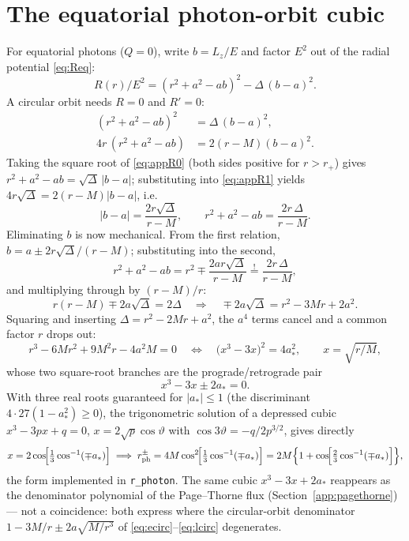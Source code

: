 \section{The equatorial photon-orbit cubic}
\label{app:photoncubic}

For equatorial photons ($Q = 0$), write $b = L_z/E$ and factor $E^2$
out of the radial potential \eqref{eq:Req}:
\begin{equation}
R(r)/E^2 = (r^2 + a^2 - ab)^2 - \Delta\,(b-a)^2 .
\end{equation}
A circular orbit needs $R = 0$ and $R' = 0$:
\begin{align}
(r^2 + a^2 - ab)^2 &= \Delta\,(b-a)^2,
\label{eq:appR0}\\
4r\,(r^2 + a^2 - ab) &= 2(r - M)(b-a)^2.
\label{eq:appR1}
\end{align}
Taking the square root of \eqref{eq:appR0} (both sides positive for
$r > r_+$) gives $r^2 + a^2 - ab = \sqrt{\Delta}\,|b - a|$; substituting
into \eqref{eq:appR1} yields
$4r\sqrt{\Delta} = 2(r-M)|b-a|$, i.e.
\begin{equation}
|b - a| = \frac{2r\sqrt{\Delta}}{r - M},
\qquad
r^2 + a^2 - ab = \frac{2r\,\Delta}{r - M}.
\label{eq:appbelim}
\end{equation}
Eliminating $b$ is now mechanical. From the first relation,
$b = a \pm 2r\sqrt{\Delta}/(r-M)$; substituting into the second,
\begin{equation}
r^2 + a^2 - ab
= r^2 \mp \frac{2ar\sqrt{\Delta}}{r-M}
\stackrel{!}{=} \frac{2r\,\Delta}{r-M} ,
\end{equation}
and multiplying through by $(r-M)/r$:
\begin{equation}
r(r-M) \mp 2a\sqrt{\Delta} = 2\Delta
\quad\Longrightarrow\quad
\mp 2a\sqrt{\Delta} = r^2 - 3Mr + 2a^2 .
\end{equation}
Squaring and inserting $\Delta = r^2 - 2Mr + a^2$, the $a^4$ terms
cancel and a common factor $r$ drops out:
\begin{equation}
r^3 - 6Mr^2 + 9M^2 r - 4a^2 M = 0
\quad\Longleftrightarrow\quad
\bigl(x^3 - 3x\bigr)^2 = 4a_*^2,
\qquad x = \sqrt{r/M},
\end{equation}
whose two square-root branches are the prograde/retrograde pair
\begin{equation}
x^3 - 3x \pm 2a_* = 0 .
\end{equation}
With three real roots guaranteed for $|a_*| \le 1$ (the discriminant
$4\cdot27(1 - a_*^2) \ge 0$), the trigonometric solution of a depressed
cubic $x^3 - 3px + q = 0$, $x = 2\sqrt p\cos\vartheta$ with
$\cos 3\vartheta = -q/2p^{3/2}$, gives directly
\begin{equation}
x = 2\cos\!\Bigl[\tfrac13\cos^{-1}(\mp a_*)\Bigr]
\;\Longrightarrow\;
r_{\rm ph}^{\pm} = 4M\cos^2\!\Bigl[\tfrac13\cos^{-1}(\mp a_*)\Bigr]
= 2M\Bigl\{1 + \cos\!\Bigl[\tfrac23\cos^{-1}(\mp a_*)\Bigr]\Bigr\},
\end{equation}
the form implemented in \texttt{r\_photon}. The same cubic
$x^3 - 3x + 2a_*$ reappears as the denominator polynomial of the
Page--Thorne flux (Section~\ref{app:pagethorne}) — not a coincidence:
both express where the circular-orbit denominator
$1 - 3M/r \pm 2a\sqrt{M/r^3}$ of
\eqref{eq:ecirc}--\eqref{eq:lcirc} degenerates.

